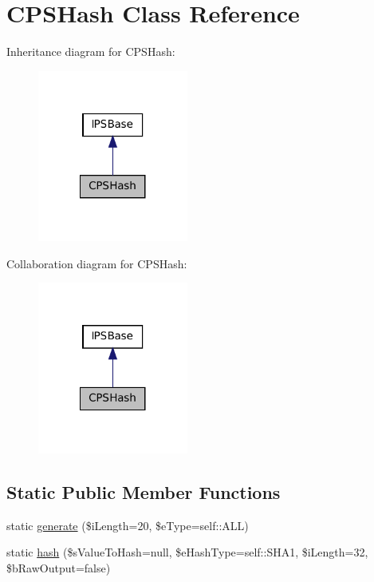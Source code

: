 \hypertarget{classCPSHash}{
\section{CPSHash Class Reference}
\label{classCPSHash}
}


Inheritance diagram for CPSHash:\nopagebreak
\begin{figure}[H]
\begin{center}
\leavevmode
\includegraphics[width=140pt]{classCPSHash__inherit__graph}
\end{center}
\end{figure}


Collaboration diagram for CPSHash:\nopagebreak
\begin{figure}[H]
\begin{center}
\leavevmode
\includegraphics[width=140pt]{classCPSHash__coll__graph}
\end{center}
\end{figure}
\subsection*{Static Public Member Functions}
\begin{DoxyCompactItemize}
\item 
static \hyperlink{classCPSHash_a3e298220b5cd30c047c32b878c7d049a}{generate} (\$iLength=20, \$eType=self::ALL)
\item 
static \hyperlink{classCPSHash_a0dafa79239f1d71f976fdd260bf2349f}{hash} (\$sValueToHash=null, \$eHashType=self::SHA1, \$iLength=32, \$bRawOutput=false)
\end{DoxyCompactItemize}
